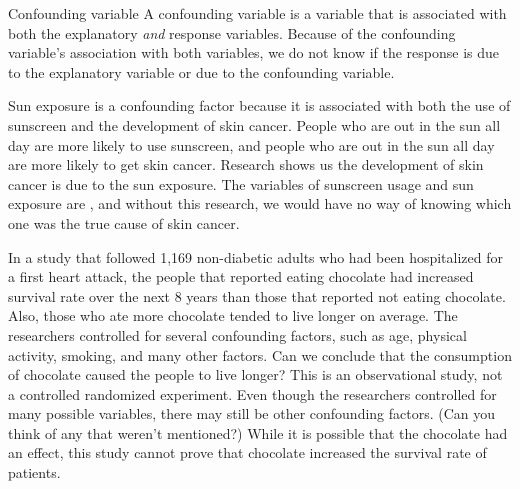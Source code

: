 \begin{onebox}{Confounding variable}
A confounding variable is a variable that is associated with both the explanatory \emph{and} response variables. Because of the confounding variable's association with both variables, we do not know if the response is due to the explanatory variable or due to the confounding variable.\end{onebox}

Sun exposure is a confounding factor because it is associated with both the use of sunscreen and the development of skin cancer. People who are out in the sun all day are more likely to use sunscreen, and people who are out in the sun all day are more likely to get skin cancer. Research shows us the development of skin cancer is due to the sun exposure. The variables of sunscreen usage and sun exposure are , and without this research, we would have no way of knowing which one was the true cause of skin cancer.

\begin{examplewrap}
\begin{nexample}{In a study that followed 1,169 non-diabetic adults who had been hospitalized for a first heart attack, the people that reported eating chocolate had increased survival rate over the next 8 years than those that reported not eating chocolate. Also, those who ate more chocolate tended to live longer on average. The researchers controlled for several confounding factors, such as age, physical activity, smoking, and many other factors. Can we conclude that the consumption of chocolate caused the people to live longer?} \label{confounding_2008_chocolate_health_study}
This is an observational study, not a controlled randomized experiment. Even though the researchers controlled for many possible variables, there may still be other confounding factors. (Can you think of any that weren't mentioned?) While it is possible that the chocolate had an effect, this study cannot prove that chocolate increased the survival rate of patients.
\end{nexample}
\end{examplewrap}

